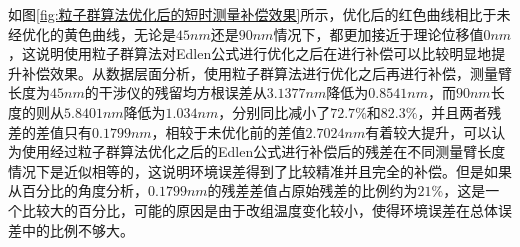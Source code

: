 如图\ref{fig:粒子群算法优化后的短时测量补偿效果}所示，优化后的红色曲线相比于未经优化的黄色曲线，无论是$45nm$还是$90nm$情况下，都更加接近于理论位移值$0nm$，这说明使用粒子群算法对Edlen公式进行优化之后在进行补偿可以比较明显地提升补偿效果。从数据层面分析，使用粒子群算法进行优化之后再进行补偿，测量臂长度为$45nm$的干涉仪的残留均方根误差从$3.1377nm$降低为$0.8541nm$，而$90nm$长度的则从$5.8401nm$降低为$1.034nm$，分别同比减小了$72.7\%$和$82.3\%$，并且两者残差的差值只有$0.1799nm$，相较于未优化前的差值$2.7024nm$有着较大提升，可以认为使用经过粒子群算法优化之后的Edlen公式进行补偿后的残差在不同测量臂长度情况下是近似相等的，这说明环境误差得到了比较精准并且完全的补偿。但是如果从百分比的角度分析，$0.1799nm$的残差差值占原始残差的比例约为$21\%$，这是一个比较大的百分比，可能的原因是由于改组温度变化较小，使得环境误差在总体误差中的比例不够大。


